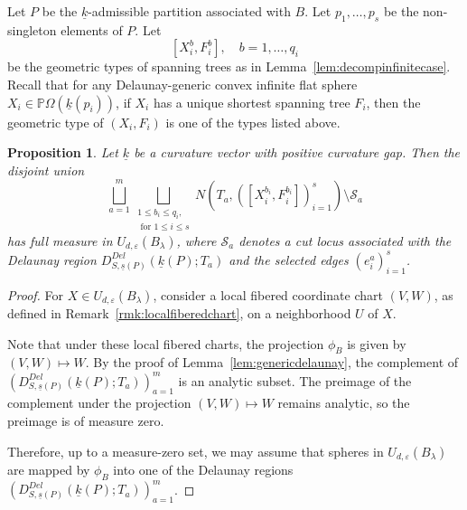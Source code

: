 \documentclass{compositio}
\numberwithin{equation}{section}
\numberwithin{figure}{section}
\theoremstyle{definition}
\theoremstyle{plain}
\newtheorem{proposition}[definition]{Proposition}
\begin{document}
{Let $P$ be the $\underline{k}$-admissible partition associated with $B$. Let $p_1, \ldots, p_s$ be the non-singleton elements of $P$. Let 
\begin{equation}\label{equ:geometrictypes}
    [X_i^b, F_i^b],\quad b = 1,\ldots, q_i
\end{equation}
be the geometric types of spanning trees as in Lemma~\ref{lem:decompinfinitecase}.
Recall that for any Delaunay-generic convex infinite flat sphere $X_i \in \mathbb{P}\Omega(\underline{k}(p_i))$, if $X_i$ has a unique shortest spanning tree $F_i$, then the geometric type of $(X_i, F_i)$ is one of the types listed above.

\begin{proposition}\label{prop:goodcoordinate}
Let $\underline{k}$ be a curvature vector with positive curvature gap. Then the disjoint union
$$
\bigsqcup_{a=1}^m \bigsqcup_{\substack{1\le b_i \le q_i,\\ \text{ for } 1\le i\le s}}  
N\left(T_a, \left([X_i^{b_i}, F_i^{b_i}]\right)_{i=1}^s \right) \setminus \mathcal{S}_a
$$
has full measure in $U_{d,\varepsilon}(B_\lambda)$, where $\mathcal{S}_a$ denotes a cut locus associated with the Delaunay region $D_{S,\underline{s}(P)}^{Del}(\underline{k}(P); T_a)$ and the selected edges $(e_i^a)_{i=1}^s$.
\end{proposition}

\begin{proof}
For $X\in U_{d,\varepsilon}(B_{\lambda})$, consider a local fibered coordinate chart $(V,W)$, as defined in Remark~\ref{rmk:localfiberedchart}, on a neighborhood $U$ of $X$.

Note that under these local fibered charts, the projection $\phi_B$ is given by $(V,W) \mapsto W$. By the proof of Lemma~\ref{lem:genericdelaunay}, the complement of $\left(D_{S,\underline{s}(P)}^{Del}(\underline{k}(P);T_a)\right)_{a=1}^m$ is an analytic subset. The preimage of the complement under the projection $(V,W) \mapsto W$ remains analytic, so the preimage is of measure zero.

Therefore, up to a measure-zero set, we may assume that spheres in $U_{d,\varepsilon}(B_{\lambda})$ are mapped by $\phi_B$ into one of the Delaunay regions $\left(D_{S,\underline{s}(P)}^{Del}(\underline{k}(P);T_a)\right)_{a=1}^m$.


\end{proof}}
\end{document}
